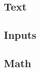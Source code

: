 \graphicspath{{sec03/images/}{sec03/code/}}
\lstset{inputpath=sec03/code}

\subsection{Text}



\subsection{Inputs}



\subsection{Math}



